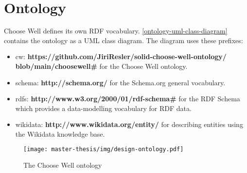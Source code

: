 \section{Ontology}
Choose Well defines its own RDF vocabulary. 
\autoref{ontology-uml-class-diagram} contains the ontology as a UML class diagram. 
The diagram uses these prefixes:

\begin{itemize}[noitemsep,nolistsep]
  \item cw: \textbf{https://github.com/JiriResler/solid-choose-well-ontology/} \newline \textbf{blob/main/choosewell\#} for the Choose Well ontology.
  \item schema: \textbf{http://schema.org/} for the Schema.org general vocabulary. 
  \item rdfs: \textbf{http://www.w3.org/2000/01/rdf-schema\#} for the RDF Schema which provides a data-modelling vocabulary for RDF data.
  \item wikidata: \textbf{http://www.wikidata.org/entity/} for describing entities using the Wikidata knowledge base.
\end{itemize}

\begin{figure}[h]
  \centering
  \texttt{[image: master-thesis/img/design-ontology.pdf]}
  \caption{The Choose Well ontology}\label{ontology-uml-class-diagram}
\end{figure}
